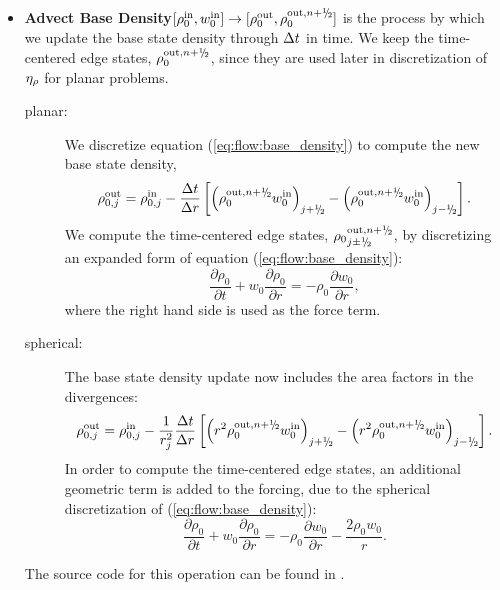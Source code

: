 \begin{itemize}
\item {\bf Advect Base Density}$[\rho_0^\inp,w_0^\inp] \rightarrow
  [\rho_0^\outp, \rho_0^{\outp,\nph}]$ is the process by which we
  update the base state density through $\Delta t$ in time.  We keep the
  time-centered edge states, $\rho_0^{\outp,\nph}$,
  since they are used later in discretization of $\eta_{\rho}$ for planar problems.
\begin{description}
\item[planar:] We discretize equation (\ref{eq:flow:base_density}) to
  compute the new base state density,
\begin{equation}
\rho_{0,j}^{\outp} = \rho_{0,j}^{\inp} - \frac{\dt}{\dr} \left [ \left( \rho_0^{\outp,\nph} w_0^{\inp}\right)_{j+\myhalf} - \left( \rho_0^{\outp,\nph} w_0^{\inp}\right)_{j-\myhalf} \right ].
\end{equation}
  We compute the time-centered edge states, ${\rho_0}^{\outp,\nph}_{j\pm\myhalf}$,
  by discretizing an expanded form of equation (\ref{eq:flow:base_density}):
\begin{equation}
\frac{\partial \rho_0}{\partial t} + w_0 \frac{\partial \rho_0}{\partial r} = - \rho_0 \frac{\partial w_0}{\partial r},
\end{equation}
  where the right hand side is used as the force term.
\item[spherical:] The base state density update now includes the area factors in the 
  divergences:
\begin{equation}
\rho_{0,j}^{\outp} = \rho_{0,j}^{\inp} - \frac{1}{r_j^2} \frac{\dt}{\dr} \left [ \left( r^2 \rho_0^{\outp,\nph} w_0^{\inp}\right)_{j+\myhalf} - \left( r^2 \rho_0^{\outp,\nph} w_0^{\inp}\right)_{j-\myhalf} \right].
\end{equation}
  In order to compute the time-centered edge states, an additional geometric 
  term is added to the forcing, due to the spherical discretization of 
  (\ref{eq:flow:base_density}):
\begin{equation}
\frac{\partial \rho_0}{\partial t} + w_0 \frac{\partial \rho_0}{\partial r} = - \rho_0 \frac{\partial w_0}{\partial r} - \frac{2 \rho_0 w_0}{r}.
\end{equation}
\end{description}

The source code for this operation can be found in .



\end{itemize}
